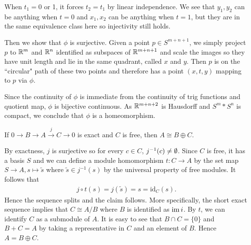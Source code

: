 \documentclass[12pt]{article}
\begin{document}
\begin{problem}[2]
When $ t_1 = 0$ or 1, it forces $  t_2 = t_1$ by linear independence. We see that $ y_1,y_2$ can be anything when $ t=0$ and  $ x_1 ,x_2$ can be anything when $ t=1$, but they are in the same equivalence class here so injectivity still holds.

Then we show that  $ \phi$ is surjective. Given a point $ p \in S^{m+n+1}$, we simply project $ p$ to $ \mathbb{R}^{m}$ and $ \mathbb{R}^{n}$ identified as subspaces of $ \mathbb{R}^{m+n+1}$ and scale the images so they have unit length and lie in the same quadrant, called $ x$ and  $ y$. Then $ p$ is on the ``circular" path of these two points and therefore has a point $ (x,t,y)$ mapping to  $ p$ via $ \phi$. 

Since the continuity of $ \phi$ is immediate from the continuity of trig functions and quotient map, $ \phi$ is bijective continuous. As $ \mathbb{R}^{m+n+2}$ is Hausdorff and $ S^{m}*S^{n}$ is compact, we conclude that $ \phi$ is a homeomorphism.
\end{problem}
\begin{problem}[3]
If $ 0 \to B \to A \xrightarrow{ j}  C \to 0$ is exact and $ C$ is free, then  $ A \cong B \oplus C$.

By exactness, $ j$ is surjective so for every $ c \in C$, $ j^{-1}(c) \neq \emptyset$. Since $ C$ is free, it has a basis $ S$ and we can define a module homomorphism $ t: C \to A$ by the set map $ S \to A, s \mapsto \widetilde{ s}$ where $ \widetilde{ s} \in j^{-1}(s)$ by the universal property of free modules. It follows that
\begin{align*}
	j \circ t (s) = j(\widetilde{s }) = s = \text{id}_{ C}(s).
\end{align*}
Hence the sequence splits and the claim follows. More specifically, the short exact sequence implies that $ C \cong A / B$ where $ B$ is identified as  $ \operatorname{im} i$. By $ t$, we can identify  $ C$ as a submodule of  $ A$. It is easy to see that  $ B \cap C = \{0\}$ and $ B+C = A$ by taking a representative in  $ C$ and an element of  $ B$. Hence  $ A = B \oplus C$.
\end{problem}
\end{document}
